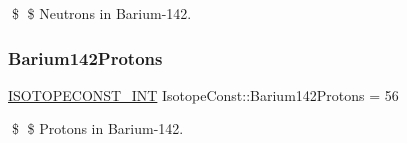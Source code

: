 \$ \$ Neutrons in Barium-\/142. \mbox{\label{group___isotope_const-_barium-_ba142_ga54451972ffa5bf07a30934a1d0f22736}} 
\subsubsection{\texorpdfstring{Barium142\+Protons}{Barium142Protons}}
{\footnotesize\ttfamily \mbox{\hyperlink{group___isotope_const-_macros_ga5f18360b3e99483a35c32d789e62621c}{I\+S\+O\+T\+O\+P\+E\+C\+O\+N\+S\+T\+\_\+\+I\+NT}} Isotope\+Const\+::\+Barium142\+Protons = 56}

\$ \$ Protons in Barium-\/142. 